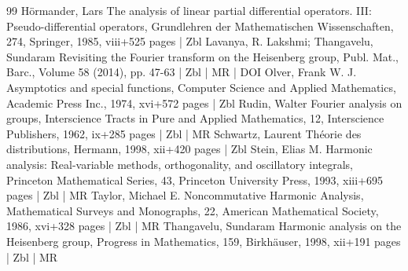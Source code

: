 \begin{thebibliography}{99}
Hörmander, Lars The analysis of linear partial differential operators. III: Pseudo-differential operators, Grundlehren der Mathematischen Wissenschaften, 274, Springer, 1985, viii+525 pages | Zbl
Lavanya, R. Lakshmi; Thangavelu, Sundaram Revisiting the Fourier transform on the Heisenberg group, Publ. Mat., Barc., Volume 58 (2014), pp. 47-63 | Zbl | MR | DOI
Olver, Frank W. J. Asymptotics and special functions, Computer Science and Applied Mathematics, Academic Press Inc., 1974, xvi+572 pages | Zbl
Rudin, Walter Fourier analysis on groups, Interscience Tracts in Pure and Applied Mathematics, 12, Interscience Publishers, 1962, ix+285 pages | Zbl | MR
Schwartz, Laurent Théorie des distributions, Hermann, 1998, xii+420 pages | Zbl
Stein, Elias M. Harmonic analysis: Real-variable methods, orthogonality, and oscillatory integrals, Princeton Mathematical Series, 43, Princeton University Press, 1993, xiii+695 pages | Zbl | MR
Taylor, Michael E. Noncommutative Harmonic Analysis, Mathematical Surveys and Monographs, 22, American Mathematical Society, 1986, xvi+328 pages | Zbl | MR
Thangavelu, Sundaram Harmonic analysis on the Heisenberg group, Progress in Mathematics, 159, Birkhäuser, 1998, xii+191 pages | Zbl | MR
\end{thebibliography}
